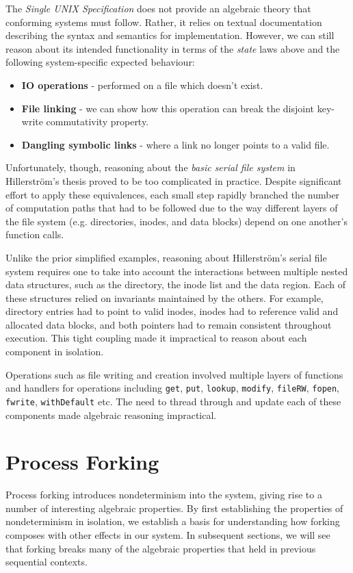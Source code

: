\documentclass[logo,bsc,singlespacing,parskip]{infthesis}
\begin{document}
The \textit{Single UNIX Specification} \cite{SUSv4} does not provide an algebraic theory that conforming systems must follow. Rather, it relies on textual documentation describing the syntax and semantics for implementation. However, we can still reason about its intended functionality in terms of the \textit{state} laws above and the following system-specific expected behaviour:

\begin{itemize}
    \item \textbf{IO operations} - performed on a file which doesn't exist.
    \item \textbf{File linking} - we can show how this operation can break the disjoint key-write commutativity property.
    \item \textbf{Dangling symbolic links} - where a link no longer points to a valid file.
\end{itemize}

Unfortunately, though, reasoning about the \textit{basic serial file system} in Hillerström's thesis proved to be too complicated in practice. Despite significant effort to apply these equivalences, each small step  rapidly branched the number of computation paths that had to be followed due to the way different layers of the file system (e.g. directories, inodes, and data blocks) depend on one another's function calls. 

Unlike the prior simplified examples, reasoning about Hillerström's serial file system requires one to take into account the interactions between multiple nested data structures, such as the directory, the inode list and the data region. Each of these structures relied on invariants maintained by the others. For example, directory entries had to point to valid inodes, inodes had to reference valid and allocated data blocks, and both pointers had to remain consistent throughout execution. This tight coupling made it impractical to reason about each component in isolation.

Operations such as file writing and creation involved multiple layers of functions and handlers for operations including \lstinline{get}, \lstinline{put}, \lstinline{lookup}, \lstinline{modify}, \lstinline{fileRW}, \lstinline{fopen}, \lstinline{fwrite}, \lstinline{withDefault} etc. The need to thread through and update each of these components made algebraic reasoning impractical.


\section{Process Forking}
Process forking introduces nondeterminism into the system, giving rise to a number of interesting algebraic properties. By first establishing the properties of nondeterminism in isolation, we establish a basis for understanding how forking composes with other effects in our system. In subsequent sections, we will see that forking breaks many of the algebraic properties that held in previous sequential contexts.
\end{document}
